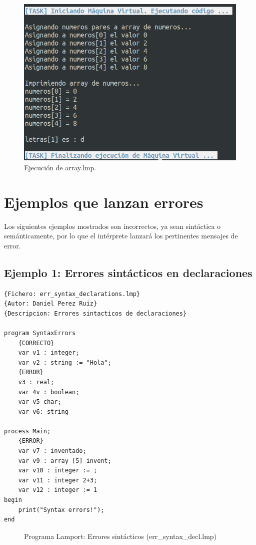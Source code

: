\newpage
\begin{figure}[h]
    \includegraphics[width=\linewidth]{images/ejemplos/array.png}
    \caption{Ejecución de array.lmp.}
    \label{fig:lamportArray_exec}
\end{figure}

\newpage
\section{Ejemplos que lanzan errores}
Los siguientes ejemplos mostrados son incorrectos, ya sean sintáctica o semánticamente, por lo que el intérprete lanzará los pertinentes mensajes de error.

\subsection{Ejemplo 1: Errores sintácticos en declaraciones}
\begin{lstlisting}[style=lamportStyle]
{Fichero: err_syntax_declarations.lmp}
{Autor: Daniel Perez Ruiz}
{Descripcion: Errores sintacticos de declaraciones}

program SyntaxErrors
	{CORRECTO}
	var v1 : integer;
	var v2 : string := "Hola";
	{ERROR}
	v3 : real;
	var 4v : boolean;
	var v5 char;
	var v6: string

process Main;
	{ERROR}
	var v7 : inventado;
	var v9 : array [5] invent;
	var v10 : integer := ;
	var v11 : integer 2+3;
	var v12 : integer := 1
begin
	print("Syntax errors!");
end
\end{lstlisting}
\begin{figure}[h]
\caption{Programa Lamport: Errores sintácticos (err\_syntax\_decl.lmp)}
\label{fig:lamportErrSintaxDecl}
\end{figure}


